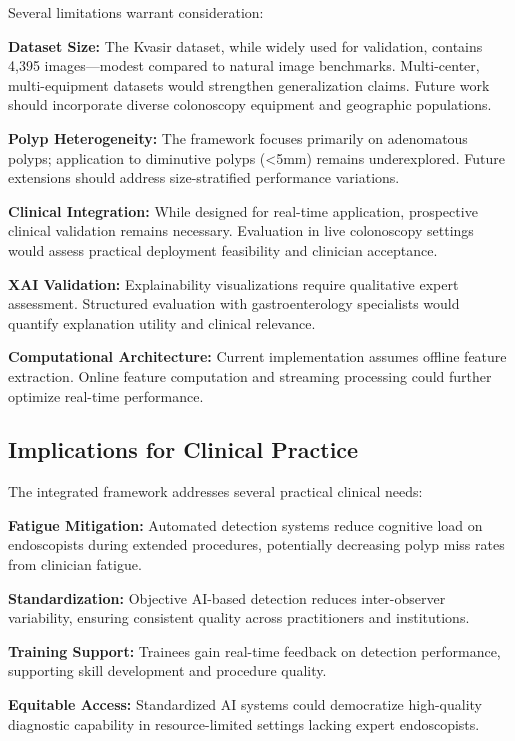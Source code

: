 \documentclass[11pt,a4paper]{article}
\begin{document}
Several limitations warrant consideration:

\textbf{Dataset Size:} The Kvasir dataset, while widely used for validation, contains 4,395 images—modest compared to natural image benchmarks. Multi-center, multi-equipment datasets would strengthen generalization claims. Future work should incorporate diverse colonoscopy equipment and geographic populations.

\textbf{Polyp Heterogeneity:} The framework focuses primarily on adenomatous polyps; application to diminutive polyps (<5mm) remains underexplored. Future extensions should address size-stratified performance variations.

\textbf{Clinical Integration:} While designed for real-time application, prospective clinical validation remains necessary. Evaluation in live colonoscopy settings would assess practical deployment feasibility and clinician acceptance.

\textbf{XAI Validation:} Explainability visualizations require qualitative expert assessment. Structured evaluation with gastroenterology specialists would quantify explanation utility and clinical relevance.

\textbf{Computational Architecture:} Current implementation assumes offline feature extraction. Online feature computation and streaming processing could further optimize real-time performance.

\subsection{Implications for Clinical Practice}

The integrated framework addresses several practical clinical needs:

\textbf{Fatigue Mitigation:} Automated detection systems reduce cognitive load on endoscopists during extended procedures, potentially decreasing polyp miss rates from clinician fatigue.

\textbf{Standardization:} Objective AI-based detection reduces inter-observer variability, ensuring consistent quality across practitioners and institutions.

\textbf{Training Support:} Trainees gain real-time feedback on detection performance, supporting skill development and procedure quality.

\textbf{Equitable Access:} Standardized AI systems could democratize high-quality diagnostic capability in resource-limited settings lacking expert endoscopists.
\end{document}
